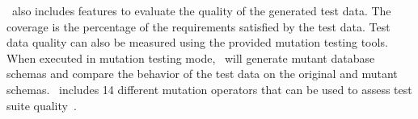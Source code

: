 \sa~also includes features to evaluate the quality of the generated test data. The coverage is the
percentage of the requirements satisfied by the test data.  Test data quality can also be measured using the provided
mutation testing tools. When executed in mutation testing mode, \sa~will generate mutant database
schemas and compare the behavior of the test data on the original and mutant schemas. \sa~includes 14
different mutation operators that can be used to assess test suite quality~\cite{wright2015mutation}.


